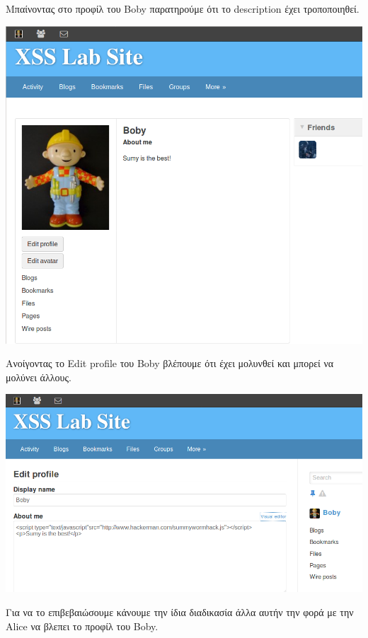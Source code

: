 \noindent
Μπαίνοντας στο προφίλ του Boby παρατηρούμε ότι το description έχει
τροποποιηθεί.
\begin{center}
			\includegraphics[width=1\textwidth]{image/6.5.PNG}		
\end{center}
\noindent
Ανοίγοντας το Edit profile του Boby βλέπουμε ότι έχει μολυνθεί και
μπορεί να μολύνει άλλους.

\begin{center}
			\includegraphics[width=1\textwidth]{image/6.6.PNG}		
\end{center}
\noindent
Για να το επιβεβαιώσουμε κάνουμε την ίδια διαδικασία άλλα αυτήν την
φορά με την Alice να βλεπει το προφίλ του Boby.

